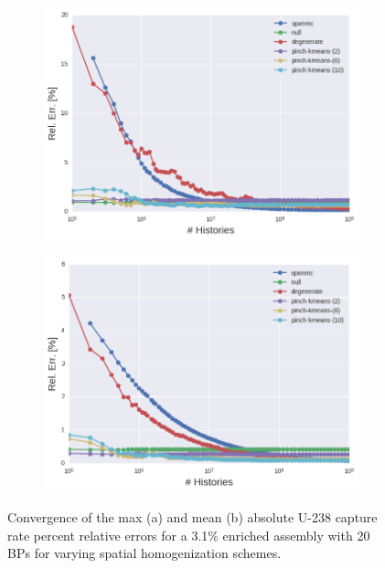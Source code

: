 \clearpage

\begin{figure}[h!]
\centering
\begin{subfigure}{\textwidth}
  \centering
  \includegraphics[width=0.9\linewidth]{figures/results/assm-31-20BPs/no-transform/evo-capture-max}
  \caption{}
  \label{fig:chap11-assm-3.1-20BPs-capture-converge-max}
\end{subfigure}
\begin{subfigure}{\textwidth}
  \centering
  \includegraphics[width=0.9\linewidth]{figures/results/assm-31-20BPs/no-transform/evo-capture-mean}
  \caption{}
  \label{fig:chap11-assm-3.1-20BPs-capture-converge-mean}
\end{subfigure}
\vspace{2mm}
\caption[Fission rate covergence for a 3.1\% enriched assembly with 20 \acp{BP}]{Convergence of the max (a) and mean (b) absolute U-238 capture rate percent relative errors for a 3.1\% enriched assembly with 20 \acp{BP} for varying spatial homogenization schemes.}
\label{fig:chap11-assm-3.1-20BPs-capture-converge}
\end{figure}

